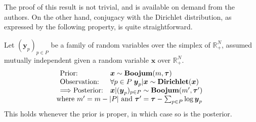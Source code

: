 The proof of this result is not trivial, and is available on demand from the authors. On the other hand, conjugacy with the Dirichlet distribution, as expressed by the following property, is quite straightforward.
\begin{proposition}
Let $(\boldsymbol{y}_p)_{p\in P}$ be a family of random variables over the simplex of $\mathbb{R}_+^N$, assumed mutually independent given a random variable $\boldsymbol{x}$ over $\mathbb{R}_+^N$.
\[
\begin{array}{l}
\begin{array}{ll}
\textrm{Prior:} & \boldsymbol{x} \sim \mathbf{Boojum}(m,\boldsymbol{\tau})\\
\textrm{Observation:} & \forall p\in P\;\boldsymbol{y}_p|\boldsymbol{x} \sim \mathbf{Dirichlet}(\boldsymbol{x})\\
\Longrightarrow
\textrm{Posterior:} &
\boldsymbol{x}|(\boldsymbol{y}_p)_{p\in P} \sim \mathbf{Boojum}(m',\boldsymbol{\tau}')
\end{array}\\
\textrm{where } m'=m-|P|\textrm{ and }\boldsymbol{\tau}'=\boldsymbol{\tau}-\sum_{p\in P}\log\boldsymbol{y}_p
\end{array}
\]
This holds whenever the prior is proper, in which case so is the posterior.
\end{proposition}
